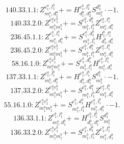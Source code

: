 \documentclass[letterpaper,10pt,fleqn,leqno,onecolumn]{article}
\begin{document}
\begin{equation} \;\;\;\;\;\;  140.33.1.1: Z^{e_{1}^{a},l_{1}^{a}}_{m_{1}^{a},d_{1}^{a}}+=H^{e_{1}^{a},l_{1}^{a}}_{d_{1}^{a},d_{2}^{a}}S^{d_{2}^{a}}_{m_{1}^{a}}\cdot -1. \end{equation}
\begin{equation} \;\;\;\;\;\;  140.33.2.0: Z^{e_{1}^{a}e_{1}^{b}}_{m_{1}^{a}m_{1}^{b}}+=S^{e_{1}^{b},d_{1}^{a}}_{m_{1}^{b},l_{1}^{a}}Z^{e_{1}^{a},l_{1}^{a}}_{m_{1}^{a},d_{1}^{a}} \end{equation}
\begin{equation} \;\;\;\;\;\;  236.45.1.1: Z^{e_{1}^{a},l_{1}^{a}}_{m_{1}^{a},d_{1}^{a}}+=S^{e_{1}^{a},d_{1}^{b}}_{m_{1}^{a},l_{1}^{b}}H^{l_{1}^{b},l_{1}^{a}}_{d_{1}^{b},d_{1}^{a}} \end{equation}
\begin{equation} \;\;\;\;\;\;  236.45.2.0: Z^{e_{1}^{a}e_{1}^{b}}_{m_{1}^{a}m_{1}^{b}}+=S^{e_{1}^{b},d_{1}^{a}}_{m_{1}^{b},l_{1}^{a}}Z^{e_{1}^{a},l_{1}^{a}}_{m_{1}^{a},d_{1}^{a}} \end{equation}
\begin{equation} \;\;\;\;\;\;  58.16.1.0: Z^{e_{1}^{a}e_{1}^{b}}_{m_{1}^{a}m_{1}^{b}}+=S^{e_{1}^{b},d_{1}^{a}}_{m_{1}^{b},l_{1}^{a}}H^{e_{1}^{a},l_{1}^{a}}_{m_{1}^{a},d_{1}^{a}} \end{equation}
\begin{equation} \;\;\;\;\;\;  137.33.1.1: Z^{e_{1}^{a},l_{1}^{b}}_{m_{1}^{b},d_{1}^{a}}+=H^{e_{1}^{a},l_{1}^{b}}_{d_{1}^{b},d_{1}^{a}}S^{d_{1}^{b}}_{m_{1}^{b}}\cdot -1. \end{equation}
\begin{equation} \;\;\;\;\;\;  137.33.2.0: Z^{e_{1}^{a}e_{1}^{b}}_{m_{1}^{a}m_{1}^{b}}+=S^{e_{1}^{b},d_{1}^{a}}_{m_{1}^{a},l_{1}^{b}}Z^{e_{1}^{a},l_{1}^{b}}_{m_{1}^{b},d_{1}^{a}} \end{equation}
\begin{equation} \;\;\;\;\;\;  55.16.1.0: Z^{e_{1}^{a}e_{1}^{b}}_{m_{1}^{a}m_{1}^{b}}+=S^{e_{1}^{b},d_{1}^{a}}_{m_{1}^{a},l_{1}^{b}}H^{e_{1}^{a},l_{1}^{b}}_{m_{1}^{b},d_{1}^{a}}\cdot -1. \end{equation}
\begin{equation} \;\;\;\;\;\;  136.33.1.1: Z^{e_{1}^{b},l_{1}^{a}}_{m_{1}^{a},d_{1}^{b}}+=H^{e_{1}^{b},l_{1}^{a}}_{d_{1}^{b},d_{1}^{a}}S^{d_{1}^{a}}_{m_{1}^{a}} \end{equation}
\begin{equation} \;\;\;\;\;\;  136.33.2.0: Z^{e_{1}^{a}e_{1}^{b}}_{m_{1}^{a}m_{1}^{b}}+=S^{e_{1}^{a},d_{1}^{b}}_{m_{1}^{b},l_{1}^{a}}Z^{e_{1}^{b},l_{1}^{a}}_{m_{1}^{a},d_{1}^{b}} \end{equation}
\end{document}
